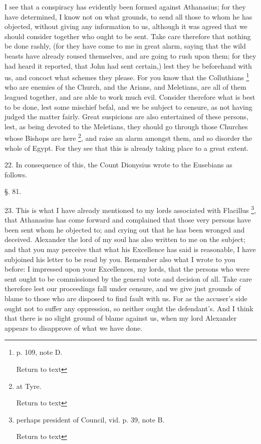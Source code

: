 I see that a conspiracy has evidently been formed
against Athanasius; for they have determined, I know not on what
grounds, to send all those to whom he has objected, without giving any
information to us, although it was agreed that we should consider
together who ought to be sent. Take care therefore that nothing be
done rashly, (for they have come to me in great alarm, saying that the
wild beasts have already roused themselves, and are going to rush upon
them; for they had heard it reported, that John had sent certain,)
lest they be beforehand with us, and concoct what schemes they please.
For you know that the Colluthians \footnote{p. 109, note D.

Return to text} who are enemies of the Church, and the Arians, and Meletians,
are all of them leagued together, and are able to work much evil.
Consider therefore what is best to be done, lest some mischief befal,
and we be subject to censure, as not having judged the matter fairly.
Great suspicions are also entertained of these persons, lest, as being
devoted to the Meletians, they should go through those Churches
whose Bishops are here \footnote{at Tyre.

Return to text},
and raise an alarm amongst them, and so disorder the whole of Egypt.
For they see that this is already taking place to a great extent.

22. In consequence of this, the Count Dionysius
wrote to the Eusebians as follows.

§. 81.

23. This is what I have already mentioned to my
lords associated with Flacillus \footnote{perhaps president of Council, vid. p. 39, note B.

Return to text}, that Athanasius has come forward and complained that those
very persons have been sent whom he objected to; and crying out that
he has been wronged and deceived. Alexander the lord of my soul has
also written to me on the subject; and that you may perceive that what
his Excellence has said is reasonable, I have subjoined his letter to
be read by you. Remember also what I wrote to you before: I impressed
upon your Excellences, my lords, that the persons who were sent ought
to be commissioned by the general vote and decision of all. Take care
therefore lest our proceedings fall under censure, and we give just
grounds of blame to those who are disposed to find fault with us. For
as the accuser's side ought not to suffer any oppression, so neither
ought the defendant's. And I think that there is no slight ground of
blame against us, when my lord Alexander appears to disapprove of what
we have done.

